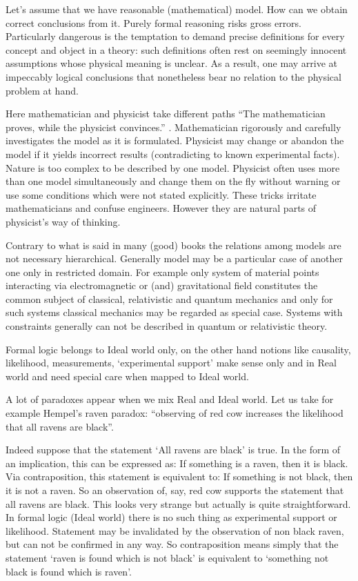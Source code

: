 Let's assume that we have reasonable (mathematical) model. How can
we obtain correct conclusions from it. 
Purely formal reasoning risks gross errors. 
Particularly dangerous is the temptation to demand precise  definitions for every concept and object in a theory: such definitions often rest on seemingly innocent assumptions 
whose physical meaning is unclear. As a result, one may arrive at impeccably logical conclusions that nonetheless bear no relation to the physical problem at hand.

Here mathematician
and physicist take different paths “The mathematician proves, while the physicist convinces.” \cite{Medvedev}. Mathematician rigorously
and carefully investigates the model as it is formulated.
Physicist may change or abandon the model if it yields 
 incorrect results (contradicting to known experimental facts).
Nature is too complex to be described by one model.
Physicist often uses more than one model simultaneously and change them on the fly 
without warning or use some conditions which were not stated explicitly. 
These tricks irritate mathematicians and confuse engineers. However they are natural parts of 
physicist's way of thinking. 

Contrary to what is said in many (good) books the relations 
among models are not necessary hierarchical. Generally model may be a particular case of another one only in restricted domain. 
For example only system of material points interacting via electromagnetic or (and) gravitational
field constitutes the common subject of classical, relativistic and quantum mechanics and only for such systems classical mechanics may be regarded as special case. Systems with constraints generally can not be described in quantum or relativistic theory.

Formal logic belongs to Ideal world only, on the other hand notions like causality,  likelihood, measurements,
`experimental support' make sense only and in Real world and need 
special care when mapped to Ideal world. 

A lot of paradoxes appear when we mix Real and Ideal world. 
Let us take for example  Hempel's raven paradox: ``observing
of red cow increases the likelihood 
that all ravens are black''. 

Indeed suppose that the statement `All ravens are black' is true.
In the form of an 
implication, this can be expressed as: If something is a raven, then it 
is black. Via contraposition, this statement is equivalent to: If something is 
not black, then it is not a raven. So an observation of, say, red cow supports 
the statement that all ravens are black. This looks very strange but actually is quite
straightforward. In formal logic (Ideal world) there is no such thing as experimental support or
likelihood. Statement may be invalidated by the observation of non black raven, 
but can not be confirmed in any way. So contraposition means simply that the 
statement `raven is found which is not black' is equivalent to 
`something not black is found which is raven'. 

